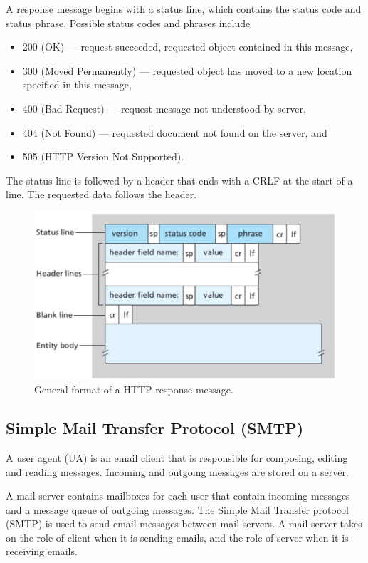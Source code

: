 A response message begins with a status line, which contains the status code and status phrase.
Possible status codes and phrases include
\begin{itemize}
  \item 200 (OK) --- request succeeded, requested object contained in this message,
  \item 300 (Moved Permanently) --- requested object has moved to a new location specified in this message,
  \item 400 (Bad Request) --- request message not understood by server,
  \item 404 (Not Found) --- requested document not found on the server, and
  \item 505 (HTTP Version Not Supported).
\end{itemize}

The status line is followed by a header that ends with a CRLF at the start of a line.
The requested data follows the header.

\begin{figure}[htp]
  \centering
  \includegraphics[width=12cm]{unit-17/figures/http-response.png}
  \caption*{General format of a HTTP response message.}
\end{figure}

\subsection{Simple Mail Transfer Protocol (SMTP)}

A user agent (UA) is an email client that is responsible for composing, editing and reading messages.
Incoming and outgoing messages are stored on a server.

A mail server contains mailboxes for each user that contain incoming messages and a message queue of outgoing messages.
The Simple Mail Transfer protocol (SMTP) is used to send email messages between mail servers.
A mail server takes on the role of client when it is sending emails, and the role of server when it is receiving emails.

